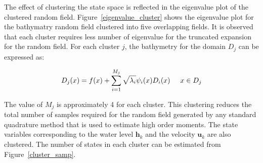 The effect of clustering the state space is reflected in the eigenvalue plot of the clustered random field. Figure~\ref{eigenvalue_cluster} shows the eigenvalue plot for the bathymatry random field clustered into five overlapping fields. It is observed that each cluster requires less number of eigenvalue for the truncated expansion for the random field. For each cluster $j$, the bathymetry for the domain $D_j$ can be expressed as:

\begin{equation}
D_j(x) = f(x) + \sum_{i=1}^{M_j } \sqrt{\lambda_i}\psi_i(x)D_i(x) \hspace{5 mm} x \in D_j
\end{equation}

The value of $M_j$ is approximately 4 for each cluster. This clustering reduces the total number of samples required for the random field generated by any standard quadrature method that is used to estimate high order moments. The state variables corresponding to the water level $\textbf{h}_{k}$ and the velocity $\textbf{u}_k$ are also clustered. The number of states in each cluster can be estimated from Figure~\ref{cluster_samp}.   


